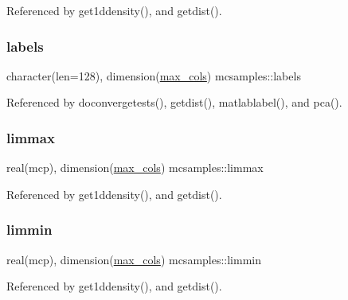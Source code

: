 Referenced by get1ddensity(), and getdist().

\mbox{\label{namespacemcsamples_abe3835988721f0cbcb6f7c28015e95f3}} 
\subsubsection{\texorpdfstring{labels}{labels}}
{\footnotesize\ttfamily character(len=128), dimension(\mbox{\hyperlink{namespacemcsamples_ae8386bad918d8af8d203683c01d5818c}{max\+\_\+cols}}) mcsamples\+::labels}



Referenced by doconvergetests(), getdist(), matlablabel(), and pca().

\mbox{\label{namespacemcsamples_a3454f7bb4ef6c4c43f38a3778b39f1ca}} 
\subsubsection{\texorpdfstring{limmax}{limmax}}
{\footnotesize\ttfamily real(mcp), dimension(\mbox{\hyperlink{namespacemcsamples_ae8386bad918d8af8d203683c01d5818c}{max\+\_\+cols}}) mcsamples\+::limmax}



Referenced by get1ddensity(), and getdist().

\mbox{\label{namespacemcsamples_a299522989433c1f723f9028e5f0460f9}} 
\subsubsection{\texorpdfstring{limmin}{limmin}}
{\footnotesize\ttfamily real(mcp), dimension(\mbox{\hyperlink{namespacemcsamples_ae8386bad918d8af8d203683c01d5818c}{max\+\_\+cols}}) mcsamples\+::limmin}



Referenced by get1ddensity(), and getdist().

\mbox{\label{namespacemcsamples_ad8e59e2a5de71cff7f1241b59b058291}} 
